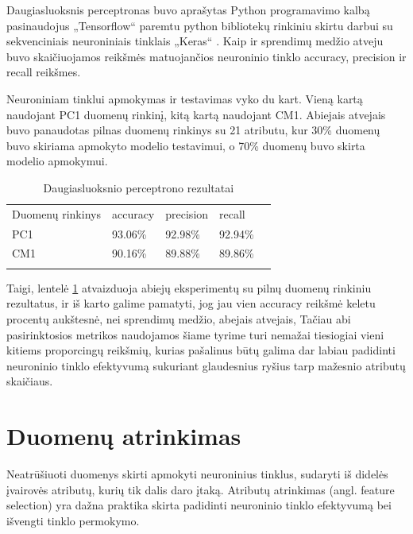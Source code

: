 \documentclass{VUMIFPSbakalaurinis}
\begin{document}
Daugiasluoksnis perceptronas buvo aprašytas Python programavimo kalbą pasinaudojus „Tensorflow“ paremtu python bibliotekų rinkiniu skirtu darbui su sekvenciniais neuroniniais tinklais „Keras“ \cite{chollet2015keras}. Kaip ir sprendimų medžio atveju buvo skaičiuojamos reikšmės matuojančios neuroninio tinklo accuracy, precision ir recall reikšmes.

Neuroniniam tinklui apmokymas ir testavimas vyko du kart. Vieną kartą naudojant PC1 duomenų rinkinį, kitą kartą naudojant CM1. Abiejais atvejais buvo panaudotas pilnas duomenų rinkinys su 21 atributu, kur 30\% duomenų buvo skiriama apmokyto modelio testavimui, o 70\% duomenų buvo skirta modelio apmokymui.

\begin{table}[H]\footnotesize
\centering
\caption{Daugiasluoksnio perceptrono rezultatai}
\label{tab:MLP_result}
\begin{tabular}{lllll}
\cline{1-4}
\multicolumn{1}{|l}{Duomenų rinkinys} & accuracy & precision & \multicolumn{1}{l|}{recall} &  \\ \cline{1-4}
\multicolumn{1}{|l}{PC1}              & 93.06\%   & 92.98\%     & \multicolumn{1}{l|}{92.94\%} &  \\
\multicolumn{1}{|l}{CM1}              & 90.16\%    & 89.88\%     & \multicolumn{1}{l|}{89.86\%}  &  \\ \cline{1-4}
                                      &          &           &                             & 
\end{tabular}
\end{table}

Taigi, lentelė \ref{tab:MLP_result} atvaizduoja abiejų eksperimentų su pilnų duomenų rinkiniu rezultatus, ir iš karto galime pamatyti, jog jau vien accuracy reikšmė keletu procentų aukštesnė, nei sprendimų medžio, abejais atvejais, Tačiau abi pasirinktosios metrikos naudojamos šiame tyrime turi nemažai tiesiogiai vieni kitiems proporcingų reikšmių, kurias pašalinus būtų galima dar labiau padidinti neuroninio tinklo efektyvumą sukuriant glaudesnius ryšius tarp mažesnio atributų skaičiaus.

\section{Duomenų atrinkimas}

Neatrūšiuoti duomenys skirti apmokyti neuroninius tinklus, sudaryti iš didelės įvairovės atributų, kurių tik dalis daro įtaką. Atributų atrinkimas (angl. feature selection) yra dažna praktika skirta padidinti neuroninio tinklo efektyvumą bei išvengti tinklo permokymo.
\end{document}
